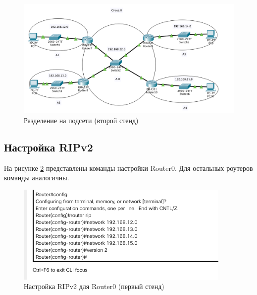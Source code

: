 \documentclass[12pt]{report}
\begin{document}
\begin{figure}[H]
	\begin{center}
		\includegraphics[scale=0.55]{img/2.png}
	\end{center}
	\caption{Разделение на подсети (второй стенд)}
	\label{fig:2}
\end{figure}

\subsection*{Настройка RIPv2}

На рисунке \ref{fig:3} представлены команды настройки Router0. Для остальных роутеров команды аналогичны.

\begin{figure}[H]
	\begin{center}
		\includegraphics[scale=0.8]{img/3_1.png}
	\end{center}
	\caption{Настройка RIPv2 для Router0 (первый стенд)}
	\label{fig:3}
\end{figure}
\end{document}
